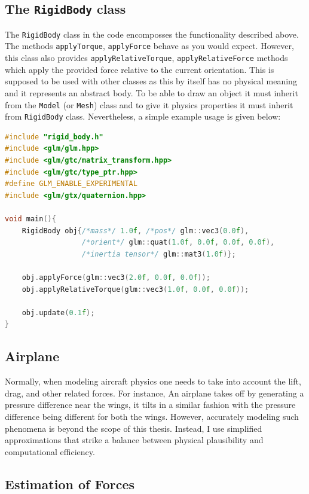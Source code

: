 \subsection{The \texttt{RigidBody} class}
The \texttt{RigidBody} class in the code encomposses the functionality described above. The methods \texttt{applyTorque}, \texttt{applyForce} behave as you would expect. However, this class also provides \texttt{applyRelativeTorque}, \texttt{applyRelativeForce} methods which apply the provided force relative to the current orientation.
This is supposed to be used with other classes as this by itself has no physical meaning and it represents an abstract body. To be able to draw an object it must inherit from the \texttt{Model} (or \texttt{Mesh}) class and to give it physics properties it must inherit from \texttt{RigidBody} class. Nevertheless, a simple example usage is given below:
\begin{lstlisting}[language=C++]
#include "rigid_body.h"
#include <glm/glm.hpp>
#include <glm/gtc/matrix_transform.hpp>
#include <glm/gtc/type_ptr.hpp>
#define GLM_ENABLE_EXPERIMENTAL
#include <glm/gtx/quaternion.hpp>

void main(){
    RigidBody obj{/*mass*/ 1.0f, /*pos*/ glm::vec3(0.0f), 
                  /*orient*/ glm::quat(1.0f, 0.0f, 0.0f, 0.0f), 
                  /*inertia tensor*/ glm::mat3(1.0f)};

    obj.applyForce(glm::vec3(2.0f, 0.0f, 0.0f));
    obj.applyRelativeTorque(glm::vec3(1.0f, 0.0f, 0.0f));

    obj.update(0.1f);
}
\end{lstlisting}

\subsection{Airplane}
Normally, when modeling aircraft physics one needs to take into account the lift, drag, and other related forces. For instance, An airplane takes off by generating a pressure difference near the wings, it tilts in a similar fashion with the pressure difference being different for both the wings. However, accurately modeling such phenomena is beyond the scope of this thesis. Instead, I use simplified approximations that strike a balance between physical plausibility and computational efficiency.

\subsection{Estimation of Forces}
